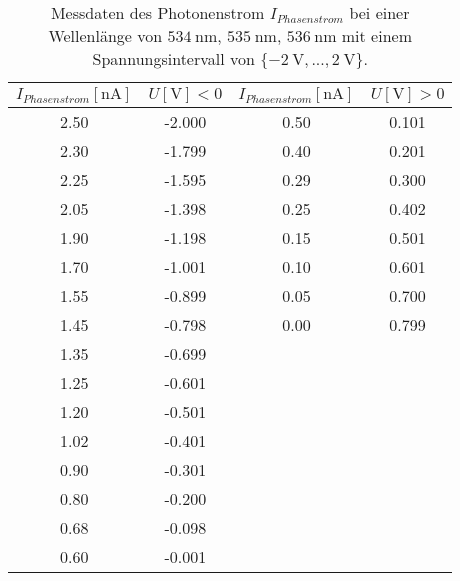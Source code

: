 \begin{table}
    \centering
    \caption{Messdaten des Photonenstrom $I_{Phasenstrom}$ bei einer Wellenlänge von $\SI{534}{\nano\meter}$, $\SI{535}{\nano\meter}$, $\SI{536}{\nano\meter}$ mit einem Spannungsintervall von $\{\SI{-2}{\volt},... ,\SI{2}{\volt}\}$.}
    \label{tab:tab3}
    \begin{tabular}{c c || c c}
        \toprule
        $I_{Phasenstrom}[\si{\nano\ampere}]$ & $U [\si{\volt}] < 0$ & $I_{Phasenstrom}[\si{\nano\ampere}]$ & $U [\si{\volt}] > 0$ \\
        \midrule
        2.50       &         -2.000   &  0.50         &        0.101    \\       
        2.30       &         -1.799   &  0.40         &        0.201    \\             
        2.25       &         -1.595   &  0.29         &        0.300    \\       
        2.05       &         -1.398   &  0.25         &        0.402    \\             
        1.90       &         -1.198   &  0.15         &        0.501    \\       
        1.70       &         -1.001   &  0.10         &        0.601    \\       
        1.55       &         -0.899   &  0.05         &        0.700    \\       
        1.45       &         -0.798   &  0.00         &        0.799    \\              
        1.35       &         -0.699   &  & \\
        1.25       &         -0.601   &  & \\       
        1.20       &         -0.501   &  & \\
        1.02       &         -0.401   &  & \\       
        0.90       &         -0.301   &  & \\
        0.80       &         -0.200   &  & \\       
        0.68       &         -0.098   &  & \\
        0.60       &         -0.001   &  & \\           

       \bottomrule
    \end{tabular}
\end{table}


